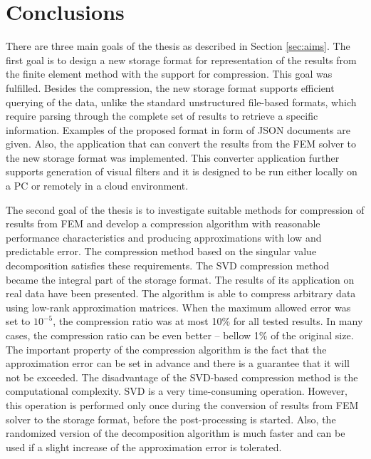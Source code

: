 \chapter{Conclusions}
\label{chapter:conclusions}


There are three main goals of the thesis as described in Section \ref{sec:aims}. The first goal is to design a new storage format for representation of the results from the finite element method with the support for compression. This goal was fulfilled. Besides the compression, the new storage format supports efficient querying of the data, unlike the standard unstructured file-based formats, which require parsing through the complete set of results to retrieve a specific information. Examples of the proposed format in form of JSON documents are given. Also, the application that can convert the results from the FEM solver to the new storage format was implemented. This converter application further supports generation of visual filters and it is designed to be run either locally on a PC or remotely in a cloud environment.

The second goal of the thesis is to investigate suitable methods for compression of results from FEM and develop a compression algorithm with reasonable performance characteristics and producing approximations with low and predictable error. The compression method based on the singular value decomposition satisfies these requirements. The SVD compression method became the integral part of the storage format. The results of its application on real data have been presented. The algorithm is able to compress arbitrary data using low-rank approximation matrices. When the maximum allowed error was set to $10^{-5}$, the compression ratio was at most 10\% for all tested results. In many cases, the compression ratio can be even better -- bellow 1\% of the original size. The important property of the compression algorithm is the fact that the approximation error can be set in advance and there is a guarantee that it will not be exceeded. The disadvantage of the SVD-based compression method is the computational complexity. SVD is a very time-consuming operation. However, this operation is performed only once during the conversion of results from FEM solver to the storage format, before the post-processing is started. Also, the randomized version of the decomposition algorithm is much faster and can be used if a slight increase of the approximation error is tolerated.

